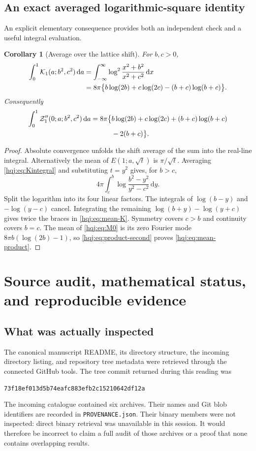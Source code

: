 \documentclass[11pt,letterpaper]{article}
\numberwithin{equation}{section}
\newtheorem{corollary}[theorem]{Corollary}
\theoremstyle{definition}
\newcommand{\dd}{\,\mathrm{d}}
\newcommand{\file}[1]{\nolinkurl{#1}}
\newcommand{\pin}{\nolinkurl{73f18ef013d5b74eafc883efb2c15210642df12a}}
\begin{document}
\subsection{An exact averaged logarithmic-square identity}
An explicit elementary consequence provides both an independent check
and a useful integral evaluation.
\begin{corollary}[Average over the lattice shift]\label{hqj:cor:mean}
For $b,c>0$,
\begin{align}
\int_0^1\mathcal K_1(a;b^2,c^2)\dd a
&=\int_{-\infty}^{\infty}
\log^2\frac{x^2+b^2}{x^2+c^2}\dd x\notag\\
&=8\pi\bigl\{b\log(2b)+c\log(2c)
-(b+c)\log(b+c)\bigr\}.
\label{hqj:eq:mean-K}
\end{align}
Consequently
\begin{align}
\int_0^1\mathcal Z_1''(0;a;b^2,c^2)\dd a
=8\pi\bigl\{&b\log(2b)+c\log(2c)
+(b+c)\log(b+c)\notag\\
&-2(b+c)\bigr\}.
\label{hqj:eq:mean-product}
\end{align}
\end{corollary}
\begin{proof}
Absolute convergence unfolds the shift average of the sum into the
real-line integral. Alternatively the mean of $E(1;a,\sqrt t)$ is
$\pi/\sqrt t$. Averaging \eqref{hqj:eq:Kintegral} and substituting
$t=y^2$ gives, for $b>c$,
\[
4\pi\int_c^b\log\frac{b^2-y^2}{y^2-c^2}\dd y.
\]
Split the logarithm into its four linear factors. The integrals of
$\log(b-y)$ and $-\log(y-c)$ cancel. Integrating the remaining
$\log(b+y)-\log(y+c)$ gives twice the braces in
\eqref{hqj:eq:mean-K}. Symmetry covers $c>b$ and continuity covers
$b=c$. The mean of \eqref{hqj:eq:M0} is its zero Fourier mode
$8\pi b(\log(2b)-1)$, so \eqref{hqj:eq:product-second} proves
\eqref{hqj:eq:mean-product}.
\end{proof}


\section{Source audit, mathematical status, and reproducible evidence}
\label{hqj:sec:audit}

\subsection{What was actually inspected}
The canonical manuscript README, its directory structure, the incoming
directory listing, and repository tree metadata were retrieved through
the connected GitHub tools. The tree commit returned during this
reading was
\begin{center}\small\pin\end{center}
The incoming catalogue contained six archives. Their names and Git blob
identifiers are recorded in \file{PROVENANCE.json}. Their binary members
were not inspected: direct binary retrieval was unavailable in this
session. It would therefore be incorrect to claim a full audit of those
archives or a proof that none contains overlapping results.
\end{document}
